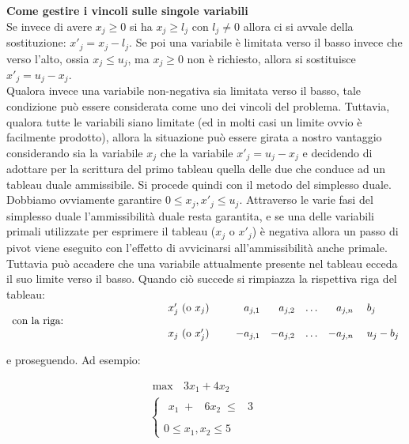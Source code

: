 \documentclass[10pt]{article}
\begin{document}
{\large \bf Come gestire i vincoli sulle singole variabili}\\

Se invece di avere $x_j \geq 0$ si ha $x_j \geq l_j$
con $l_j\neq 0$ allora ci si avvale della sostituzione:
$x'_j = x_j - l_j$.
Se poi una variabile \`e limitata verso il basso
invece che verso l'alto, 
ossia $x_j \leq u_j$,
ma $x_j \geq 0$ non \`e richiesto,
allora si sostituisce 
$x'_j = u_j - x_j$.\\ 

Qualora invece una variabile non-negativa
sia limitata verso il basso,
tale condizione pu\`o essere considerata
come uno dei vincoli del problema.
Tuttavia, qualora tutte le variabili siano limitate
(ed in molti casi un limite ovvio \`e facilmente prodotto),
allora la situazione pu\`o essere girata a nostro vantaggio
considerando sia la variabile $x_j$ che
la variabile $x'_j = u_j - x_j$
e decidendo di adottare per la scrittura
del primo tableau quella delle due che
conduce ad un tableau duale ammissibile.
Si procede quindi con il metodo del simplesso duale.
Dobbiamo ovviamente garantire $0\leq x_j,x'_j \leq u_j$.
Attraverso le varie fasi del simplesso duale
l'ammissibilit\`a duale resta garantita,
e se una delle variabili primali utilizzate per esprimere
il tableau ($x_j$ o $x'_j$) \`e negativa allora 
un passo di pivot viene eseguito con l'effetto
di avvicinarsi all'ammissibilit\`a anche primale.
Tuttavia pu\`o accadere che una variabile attualmente
presente nel tableau ecceda il suo limite verso il basso.
Quando ci\`o succede si rimpiazza la rispettiva riga del tableau:\\

\noindent
$
\begin{array}{llrrrrl}
 &x'_j \mbox{ (o $x_j$) \hspace{0.3cm} } &
        a_{j,1} & a_{j,2} & \ldots & a_{j,n} & \; b_j\\ 
\mbox{con la riga: \hspace{3cm}}\\
 &x_j \mbox{ (o $x'_j$) \hspace{0.3cm} } &
        -a_{j,1} & -a_{j,2} & \ldots & -a_{j,n} & \; u_j - b_j\\ 
\end{array}
$

e proseguendo.  Ad esempio:

\[
   \begin{array}{l}
        \max \mbox{\ }3x_1 + 4x_2 \\
        \left\{
        \begin{array}{l}
        \begin{array}{rrrr}
             x_1 \;+&  6x_2 \;\leq &   3 \\
        \end{array} \\
        0 \leq x_1, x_2  \leq 5    
        \end{array}
        \right.
   \end{array}
\]
\end{document}
